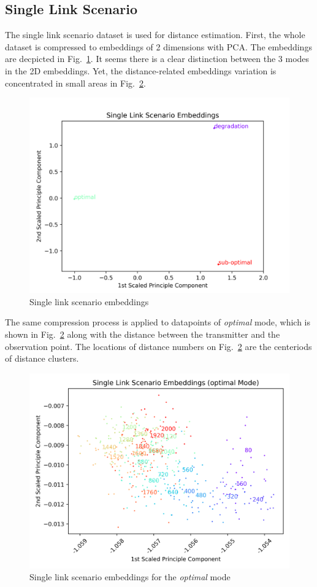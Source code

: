 \documentclass[lettersize,journal, one-column]{IEEEtran}
\begin{document}
\subsection{Single Link Scenario}
\label{section:results_single_link}
The single link scenario dataset is used for distance estimation.
First, the whole dataset is compressed to embeddings of 2 dimensions with PCA.
The embeddings are decpicted in Fig.~\ref{figure:single_whole}.
It seems there is a clear distinction between the 3 modes in the 2D embeddings.
Yet, the distance-related embeddings variation is concentrated in small areas in Fig.~\ref{figure:single_optimal}.
\begin{figure}
	\centering
    \includegraphics[width=\columnwidth]{figures/single_scenario.png}
    \caption{Single link scenario embeddings}
	\label{figure:single_whole}
\end{figure}
The same compression process is applied to datapoints of \textit{optimal} mode, which is shown in Fig.~\ref{figure:single_optimal} along with the distance between the transmitter and the observation point.
The locations of distance numbers on Fig.~\ref{figure:single_optimal} are the centeriods of distance clusters.
\begin{figure}
	\centering
    \includegraphics[width=\columnwidth]{figures/single_scenario(optimal).png}
    \caption{Single link scenario embeddings for the \textit{optimal} mode}
	\label{figure:single_optimal}
\end{figure}
\end{document}
